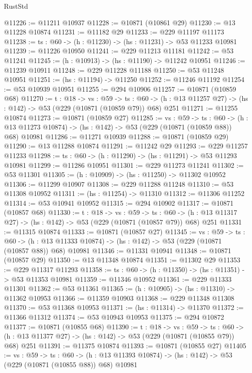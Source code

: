 \begin{lexlean}{RustStd}
\begin{coremodule}
@11226 := @11211 @10937
@11228 := @10871 (@10861 @29)
@11230 := @13 @11228 @10874
@11231 := @11182 @29
@11233 := @229 @11197 @11173
@11238 := {ts : @60} -> (h : @11230) -> (hs : @11231) -> @53 @11233 @10981
@11239 := @11226 @10950
@11241 := @229 @11213 @11181
@11242 := @53 @11241
@11245 := (h : @10913) -> (hs : @11190) -> @11242 @10951
@11246 := @11239 @10911
@11248 := @229 @11228 @11188
@11250 := @53 @11248 @10951
@11251 := (hs : @11194) -> @11250
@11252 := @11246 @11192
@11254 := @53 @10939 @10951
@11255 := @294 @10906
@11257 := @10871 (@10859 @68)
@11270 := {t : @18} ->
  {vs : @59} ->
  {ts : @60} -> (h : @13 @11257 @27) -> (hs : @142) -> @53 (@229 (@10871 (@10859 @79)) @68) @251
@11271 := @11255 @10874
@11273 := @10871 (@10859 @27)
@11285 := {vs : @59} ->
  {ts : @60} ->
  (h : @13 @11273 @10874) -> (hs : @142) -> @53 (@229 (@10871 (@10859 @88)) @68) @10981
@11286 := @11271 @10939
@11288 := @10871 (@10859 @29)
@11290 := @13 @11288 @10874
@11291 := @11242 @29
@11293 := @229 @11257 @11233
@11298 := {ts : @60} -> (h : @11290) -> (hs : @11291) -> @53 @11293 @10981
@11299 := @11286 @10951
@11301 := @229 @11273 @11241
@11302 := @53 @11301
@11305 := (h : @10909) -> (hs : @11250) -> @11302 @10952
@11306 := @11299 @10907
@11308 := @229 @11288 @11248
@11310 := @53 @11308 @10952
@11311 := (hs : @11254) -> @11310
@11312 := @11306 @11252
@11314 := @53 @10941 @10952
@11315 := @294 @10902
@11317 := @10871 (@10857 @68)
@11330 := {t : @18} ->
  {vs : @59} ->
  {ts : @60} -> (h : @13 @11317 @27) -> (hs : @142) -> @53 (@229 (@10871 (@10857 @79)) @68) @251
@11331 := @11315 @10874
@11333 := @10871 (@10857 @27)
@11345 := {vs : @59} ->
  {ts : @60} ->
  (h : @13 @11333 @10874) -> (hs : @142) -> @53 (@229 (@10871 (@10857 @88)) @68) @10981
@11346 := @11331 @10941
@11348 := @10871 (@10857 @29)
@11350 := @13 @11348 @10874
@11351 := @11302 @29
@11353 := @229 @11317 @11293
@11358 := {ts : @60} -> (h : @11350) -> (hs : @11351) -> @53 @11353 @10981
@11359 := @11346 @10952
@11361 := @229 @11333 @11301
@11362 := @53 @11361
@11365 := (h : @10905) -> (hs : @11310) -> @11362 @10953
@11366 := @11359 @10903
@11368 := @229 @11348 @11308
@11370 := @53 @11368 @10953
@11371 := (hs : @11314) -> @11370
@11372 := @11366 @11312
@11374 := @53 @10943 @10953
@11375 := @294 @10872
@11377 := @10871 (@10855 @68)
@11390 := {t : @18} ->
  {vs : @59} ->
  {ts : @60} -> (h : @13 @11377 @27) -> (hs : @142) -> @53 (@229 (@10871 (@10855 @79)) @68) @251
@11391 := @11375 @10874
@11393 := @10871 (@10855 @27)
@11405 := {vs : @59} ->
  {ts : @60} ->
  (h : @13 @11393 @10874) -> (hs : @142) -> @53 (@229 (@10871 (@10855 @88)) @68) @10981

\end{coremodule}
\end{lexlean}
